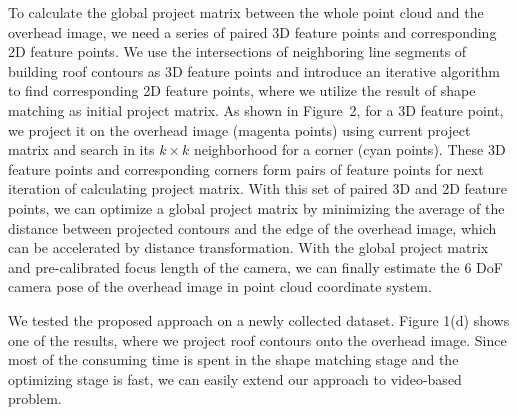 \documentclass[sigconf,authorversion]{acmart}
\begin{document}
To calculate the global project matrix between the whole point cloud and the overhead image, we need a series of paired 3D feature points and corresponding 2D feature points. We use the intersections of neighboring line segments of building roof contours as 3D feature points and introduce an iterative algorithm to find corresponding 2D feature points, where we utilize the result of shape matching as initial project matrix.
As shown in Figure~2, for a 3D feature point, we project it on the overhead image (magenta points) using current project matrix and search in its $k\times k$ neighborhood for a corner (cyan points). These 3D feature points and corresponding corners form pairs of feature points for next iteration of calculating project matrix.
With this set of paired 3D and 2D feature points, we can optimize a global project matrix by minimizing the average of the distance between projected contours and the edge of the overhead image, which can be accelerated by distance transformation. With the global project matrix and pre-calibrated focus length of the camera, we can finally estimate the 6 DoF camera pose of the overhead image in point cloud coordinate system.

We tested the proposed approach on a newly collected dataset. Figure 1(d) shows one of the results, where we project roof contours onto the overhead image. Since most of the consuming time is spent in the shape matching stage and the optimizing stage is fast, we can easily extend our approach to video-based problem. 


 
\end{document}
